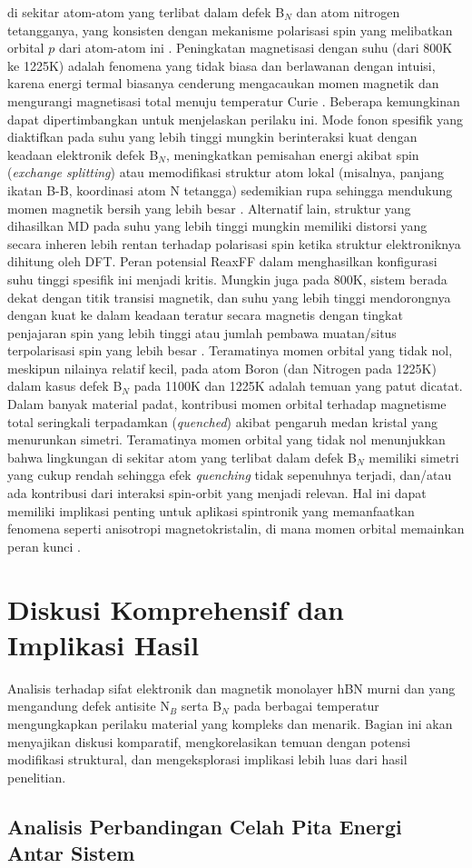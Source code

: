 di sekitar atom-atom yang terlibat dalam defek B$_N$ dan atom nitrogen tetangganya, yang konsisten dengan mekanisme polarisasi spin yang melibatkan orbital $p$ dari atom-atom ini . Peningkatan magnetisasi dengan suhu (dari 800K ke 1225K) adalah fenomena yang tidak biasa dan berlawanan dengan intuisi, karena energi termal biasanya cenderung mengacaukan momen magnetik dan mengurangi magnetisasi total menuju temperatur Curie . Beberapa kemungkinan dapat dipertimbangkan untuk menjelaskan perilaku ini. Mode fonon spesifik yang diaktifkan pada suhu yang lebih tinggi mungkin berinteraksi kuat dengan keadaan elektronik defek B$_N$, meningkatkan pemisahan energi akibat spin (\textit{exchange splitting}) atau memodifikasi struktur atom lokal (misalnya, panjang ikatan B-B, koordinasi atom N tetangga) sedemikian rupa sehingga mendukung momen magnetik bersih yang lebih besar . Alternatif lain, struktur yang dihasilkan MD pada suhu yang lebih tinggi mungkin memiliki distorsi yang secara inheren lebih rentan terhadap polarisasi spin ketika struktur elektroniknya dihitung oleh DFT. Peran potensial ReaxFF dalam menghasilkan konfigurasi suhu tinggi spesifik ini menjadi kritis. Mungkin juga pada 800K, sistem berada dekat dengan titik transisi magnetik, dan suhu yang lebih tinggi mendorongnya dengan kuat ke dalam keadaan teratur secara magnetis dengan tingkat penjajaran spin yang lebih tinggi atau jumlah pembawa muatan/situs terpolarisasi spin yang lebih besar . Teramatinya momen orbital yang tidak nol, meskipun nilainya relatif kecil, pada atom Boron (dan Nitrogen pada 1225K) dalam kasus defek B$_N$ pada 1100K dan 1225K  adalah temuan yang patut dicatat. Dalam banyak material padat, kontribusi momen orbital terhadap magnetisme total seringkali terpadamkan (\textit{quenched}) akibat pengaruh medan kristal yang menurunkan simetri. Teramatinya momen orbital yang tidak nol menunjukkan bahwa lingkungan di sekitar atom yang terlibat dalam defek B$_N$ memiliki simetri yang cukup rendah sehingga efek \textit{quenching} tidak sepenuhnya terjadi, dan/atau ada kontribusi dari interaksi spin-orbit yang menjadi relevan. Hal ini dapat memiliki implikasi penting untuk aplikasi spintronik yang memanfaatkan fenomena seperti anisotropi magnetokristalin, di mana momen orbital memainkan peran kunci . \section{Diskusi Komprehensif dan Implikasi Hasil}
\label{sec:diskusi_komprehensif}
Analisis terhadap sifat elektronik dan magnetik monolayer hBN murni dan yang mengandung defek antisite N$_B$ serta B$_N$ pada berbagai temperatur mengungkapkan perilaku material yang kompleks dan menarik. Bagian ini akan menyajikan diskusi komparatif, mengkorelasikan temuan dengan potensi modifikasi struktural, dan mengeksplorasi implikasi lebih luas dari hasil penelitian. \subsection{Analisis Perbandingan Celah Pita Energi Antar Sistem}

